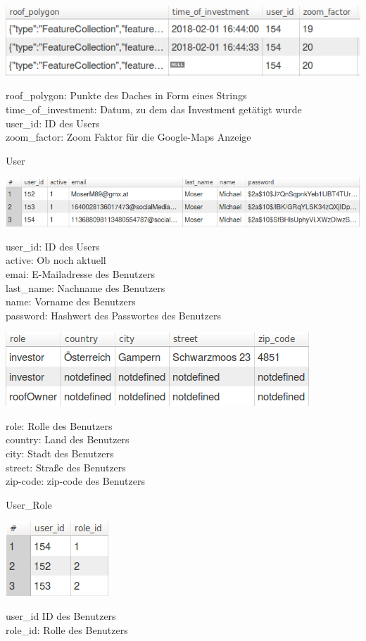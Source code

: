 \documentclass[12pt,a4paper]{article}
\begin{document}
\includegraphics[scale=0.5]{./Graphics/roof2}

\noindent \textbullet roof\_polygon: Punkte des Daches in Form eines Strings\\
\textbullet time\_of\_investment: Datum, zu dem das Investment getätigt wurde\\
\textbullet user\_id: ID des Users\\
\textbullet zoom\_factor: Zoom Faktor für die Google-Maps Anzeige\\
\bigskip

\textbullet User

\includegraphics[scale=0.5]{./Graphics/user1}

\noindent \textbullet user\_id: ID des Users\\
\textbullet active: Ob noch aktuell \\
\textbullet emai: E-Mailadresse des Benutzers\\
\textbullet last\_name: Nachname des Benutzers\\
\textbullet name: Vorname des Benutzers\\
\textbullet password: Hashwert des Passwortes des Benutzers \\
\bigskip

\includegraphics[scale=0.5]{./Graphics/user2}

\noindent \textbullet role: Rolle des Benutzers\\
\textbullet country: Land des Benutzers\\
\textbullet city: Stadt des Benutzers\\
\textbullet street: Straße des Benutzers\\
\textbullet zip-code: zip-code des Benutzers\\
\bigskip

\textbullet User\_Role

\includegraphics[scale=0.5]{./Graphics/user_role}

\noindent \textbullet user\_id ID des Benutzers\\
\textbullet role\_id: Rolle des Benutzers\\
\bigskip
\end{document}
